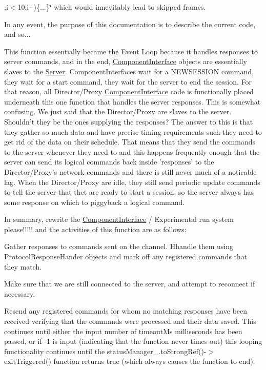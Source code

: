 ;i$<$10;i-\/-\/)\{...\}\char`\"{} which would innevitably lead to skipped frames.

In any event, the purpose of this documentation is to describe the current code, and so...

This function essentially became the Event Loop because it handles responses to server commands, and in the end, \hyperlink{class_component_interface}{Component\-Interface} objects are essentially slaves to the \hyperlink{class_server}{Server}. Component\-Interfaces wait for a N\-E\-W\-S\-E\-S\-S\-I\-O\-N command, they wait for a start command, they wait for the server to end the session. For that reason, all Director/\-Proxy \hyperlink{class_component_interface}{Component\-Interface} code is functionally placed underneath this one function that handles the server responses. This is somewhat confusing. We just said that the Director/\-Proxy are slaves to the server. Shouldn't they be the ones supplying the responses? The answer to this is that they gather so much data and have precise timing requirements such they need to get rid of the data on their schedule. That means that they send the commands to the server whenever they need to and this happens frequently enough that the server can send its logical commands back inside 'responses' to the Director/\-Proxy's network commands and there is still never much of a noticable lag. When the Director/\-Proxy are idle, they still send periodic update commands to tell the server that thet are ready to start a session, so the server always has some response on which to piggyback a logical command.

In summary, rewrite the \hyperlink{class_component_interface}{Component\-Interface} / Experimental run system please!!!!! and the activities of this function are as follows\-:
\begin{DoxyItemize}
\item Gather responses to commands sent on the channel. Hhandle them using Protocol\-Response\-Hander objects and mark off any registered commands that they match.
\item Make sure that we are still connected to the server, and attempt to reconnect if necessary.
\item Resend any registered commands for whom no matching responses have been received verifying that the commands were processed and their data saved. This continues until either the input number of timeout\-Ms milliseconds has been passed, or if -\/1 is input (indicating that the function never times out) this looping functionality continues until the status\-Manager\-\_\-.\-to\-Strong\-Ref()-\/$>$exit\-Triggered() function returns true (which always causes the function to end).
\end{DoxyItemize}

